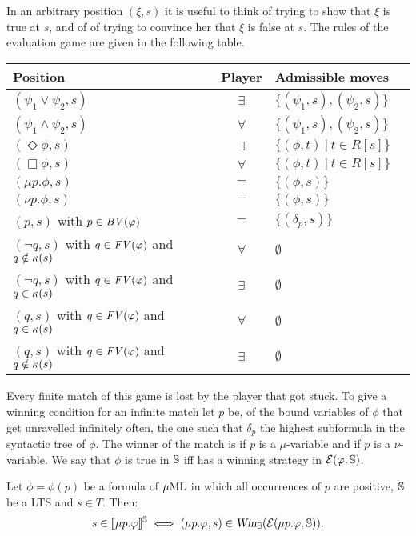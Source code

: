 In an arbitrary position $(\xi,s)$ it is useful to think of \eloise trying to
show that $\xi$ is true at $s$, and of \abelard of trying to convince her that 
$\xi$ is false at $s$. 
The rules of the evaluation game are given in  the following table.%
\begin{center}
\begin{tabular}{|l|c|l|c|}
\hline
Position & Player & Admissible moves
\\ \hline
   $(\psi_1 \vee \psi_2,s)$   & $\exists$ & $\{(\psi_1,s),(\psi_2,s) \}$ 
\\ $(\psi_1 \wedge \psi_2,s)$ & $\forall$ & $\{(\psi_1,s),(\psi_2,s) \}$ 
\\ $(\Diamond\phi,s)$         & $\exists$ & $\{(\phi,t)\ |\ t \in R[s] \}$ 
\\ $(\Box\phi,s)$             & $\forall$ & $\{(\phi,t)\ |\ t \in R[s] \}$ 
\\ $(\mu p.\phi,s)$           & $-$       & $\{(\phi,s) \}$ 
\\ $(\nu p.\phi,s)$           & $-$       & $\{(\phi,s) \}$ 
\\ $(p,s)$ with $p \in \mathit{BV}(\varphi)$ & $-$ & $\{(\delta_p,s) \}$ 
\\ $(\lnot q,s)$ with $q \in \mathit{FV}(\varphi)$ and $q \notin \kappa(s)$ 
   & $\forall$ & $\emptyset$
\\ $(\lnot q,s)$ with $q \in \mathit{FV}(\varphi)$ and $q \in \kappa(s)$ 
   & $\exists$ & $\emptyset$
\\ $(q,s)$ with $q \in \mathit{FV}(\varphi)$ and $q \in \kappa(s)$ 
   & $\forall$ & $\emptyset$
\\ $(q,s)$ with $q \in \mathit{FV}(\varphi)$ and $q \notin \kappa(s)$ 
   & $\exists$ & $\emptyset$
\\ \hline
\end{tabular}
\end{center}
Every finite match of this game is lost by the player that got stuck. 
To give a winning condition for an infinite match let $p$ be, of the bound 
variables of $\phi$ that get unravelled infinitely often, the one such that 
$\delta_{p}$ the highest subformula in the syntactic tree of $\phi$. 
The winner of the match is \abelard if $p$ is a $\mu$-variable and \eloise if 
$p$ is a $\nu$-variable.
We say that $\phi$ is true in $\mathbb{S}$ iff \eloise has a winning strategy in 
$\mathcal{E}(\varphi,\mathbb{S})$.

\begin{proposition}\label{p:unfold=evalgame}
Let $\phi = \phi(p)$ be a formula of $\mu\mathrm{ML}$ in which all occurrences of $p$ are positive, $\mathbb{S}$ be a LTS and $s \in T$. Then:
\begin{equation}
\label{eq:adeq3}
s \in \ext{\mu p.\phi}^{\bbS} %
\iff (\mu p.\phi,s) \in \win_{\eloise}(\egame(\mu p.\phi,\bbS)).
\end{equation}
\end{proposition}

